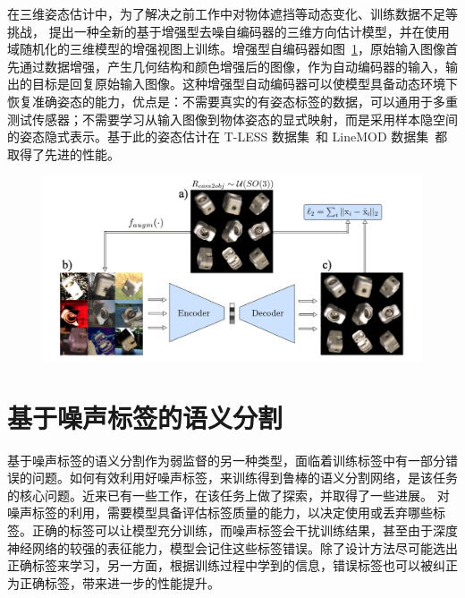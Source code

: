 在三维姿态估计中，为了解决之前工作中对物体遮挡等动态变化、训练数据不足等挑战，\citet{Sundermeyer_2018_ECCV} 提出一种全新的基于增强型去噪自编码器的三维方向估计模型，并在使用域随机化的三维模型的增强视图上训练。增强型自编码器如图~\ref{c2_fig11}，原始输入图像首先通过数据增强，产生几何结构和颜色增强后的图像，作为自动编码器的输入，输出的目标是回复原始输入图像。这种增强型自动编码器可以使模型具备动态环境下恢复准确姿态的能力，优点是：不需要真实的有姿态标签的数据，可以通用于多重测试传感器；不需要学习从输入图像到物体姿态的显式映射，而是采用样本隐空间的姿态隐式表示。基于此的姿态估计在 T-LESS 数据集~\citep{hodan2017t}和 LineMOD 数据集~\citep{hinterstoisser2011multimodal}都取得了先进的性能。
    \begin{figure}[tbp]
        \centering 
        \includegraphics[width=1.0\textwidth]{img/c2/rel_b5.png}
        \label{c2_fig11}
    \end{figure}

\section{基于噪声标签的语义分割}
基于噪声标签的语义分割作为弱监督的另一种类型，面临着训练标签中有一部分错误的问题。如何有效利用好噪声标签，来训练得到鲁棒的语义分割网络，是该任务的核心问题。近来已有一些工作\citep{Zhu2019PickandLearnAQ,Xue2020CascadedRL,Zhang2020CharacterizingLE,Zhang2020RobustMI}，在该任务上做了探索，并取得了一些进展。
对噪声标签的利用，需要模型具备评估标签质量的能力，以决定使用或丢弃哪些标签。正确的标签可以让模型充分训练，而噪声标签会干扰训练结果，甚至由于深度神经网络的较强的表征能力，模型会记住这些标签错误。除了设计方法尽可能选出正确标签来学习，另一方面，根据训练过程中学到的信息，错误标签也可以被纠正为正确标签，带来进一步的性能提升。

